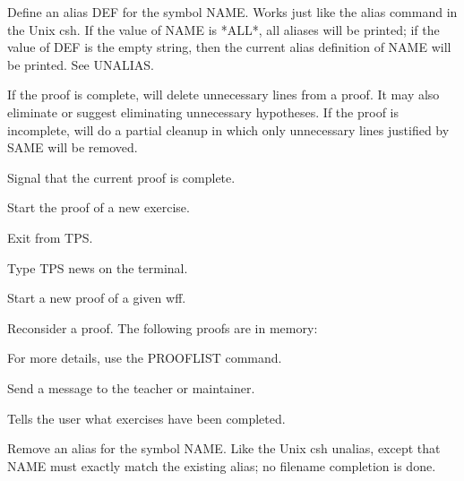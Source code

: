 \begin{description} 
\item[\parbox{\textwidth}{ALIAS \textit{name} \textit{def}}]  
Define an alias DEF for the symbol NAME.  Works just like the
alias command in the Unix csh.  If the value of NAME is *ALL*, all
aliases will be printed; if the value of DEF is the empty string, then
the current alias definition of NAME will be printed.  See UNALIAS.

\item[\parbox{\textwidth}{CLEANUP}]  
If the proof is complete, will delete unnecessary lines 
from a proof.  It may also eliminate or suggest eliminating
unnecessary hypotheses.
If the proof is incomplete, will do a partial cleanup in which
only unnecessary lines justified by SAME will be removed.

\item[\parbox{\textwidth}{DONE}]  
Signal that the current proof is complete.

\item[\parbox{\textwidth}{EXERCISE \textit{excno}}]  
Start the proof of a new exercise.

\item[\parbox{\textwidth}{EXIT}]  
Exit from TPS.

\item[\parbox{\textwidth}{NEWS}]  
Type TPS news on the terminal.

\item[\parbox{\textwidth}{PROVE \textit{wff} \textit{prefix} \textit{num}}]  
Start a new proof of a given wff.

\item[\parbox{\textwidth}{RECONSIDER \textit{prefix}}]  
Reconsider a proof. The following proofs are in memory:

For more details, use the PROOFLIST command.


\item[\parbox{\textwidth}{REMARK \textit{remark}}]  
Send a message to the teacher or maintainer.

\item[\parbox{\textwidth}{SUMMARY}]  
Tells the user what exercises have been completed.

\item[\parbox{\textwidth}{UNALIAS \textit{name}}]  
Remove an alias for the symbol NAME.  Like the Unix csh
unalias, except that NAME must exactly match the existing alias; no
filename completion is done.
\item
\end{description}

